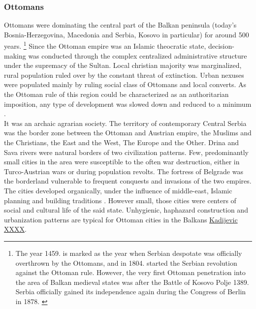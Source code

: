 \documentclass[11pt]{report}
\begin{document}
\subsubsection{Ottomans}

Ottomans were dominating the central part of the Balkan peninsula (today’s Bosnia-Herzegovina,  Macedonia  and  Serbia,  Kosovo  in  particular) for around 500 years.
\footnote{The year 1459. is marked as the year when Serbian despotate was officially overthrown by the Ottomans, and in 1804. started the Serbian revolution against the Ottoman rule. However, the very first Ottoman penetration into the area of Balkan medieval  states was after the Battle of Kosovo Polje 1389. Serbia officially gained its independence again during the Congress of Berlin in 1878. \href{}{\citealt{corovic_istorija_1997}}}
Since the Ottoman empire was an Islamic theocratic state, decision-making was conducted through the complex centralized administrative structure under the supremacy of the Sultan. Local christian majority was marginalized, rural population ruled over by the constant threat of extinction. Urban nexuses were populated mainly by ruling social class of Ottomans and local converts. As the Ottoman rule of this region could be characterized as an authoritarian imposition, any type of development was slowed down and reduced to a minimum \href{}{\citealt{nedovicbudic_waves_2006}}.
\\

It was an archaic agrarian society. The territory of contemporary Central Serbia was the border zone between the Ottoman and Austrian empire, the Muslims and the Christians, the East and the West, The Europe and the Other.
Drina and Sava rivers were natural borders of two civilization patterns. Few, predominantly small cities in the area were susceptible to the often war destruction, either in Turco-Austrian wars or during population revolts. The fortress of Belgrade was the borderland vulnerable to frequent conquests and invasions of the two empires. The cities developed organically, under the influence of middle-east, Islamic planning and building traditions \href{}{\citealt{naci ref ref from waves of planning 2006}}. However small, those cities were centers of social and cultural life of the said state. Unhygienic, haphazard construction and urbanization patterns are typical for Ottoman cities in the Balkans \href{}{Kadijevic XXXX}. 
\\ 
\end{document}
